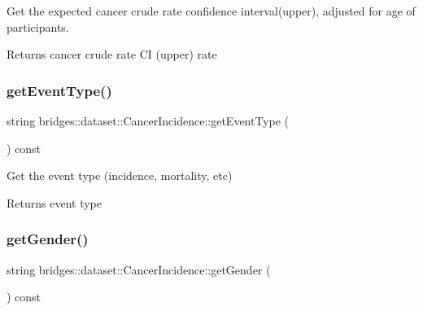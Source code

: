 Get the expected cancer crude rate confidence interval(upper), adjusted for age of participants.

\begin{DoxyReturn}{Returns}
cancer crude rate CI (upper) rate 
\end{DoxyReturn}
\mbox{\label{classbridges_1_1dataset_1_1_cancer_incidence_a964d0fcc125808e457b1fd2f79cf43bf}} 
\subsubsection{\texorpdfstring{get\+Event\+Type()}{getEventType()}}
{\footnotesize\ttfamily string bridges\+::dataset\+::\+Cancer\+Incidence\+::get\+Event\+Type (\begin{DoxyParamCaption}{ }\end{DoxyParamCaption}) const\hspace{0.3cm}{\ttfamily [inline]}}



Get the event type (incidence, mortality, etc) 

\begin{DoxyReturn}{Returns}
event type 
\end{DoxyReturn}
\mbox{\label{classbridges_1_1dataset_1_1_cancer_incidence_a0c4dcbde0ad1f81ffe4016c12d08c4c1}} 
\subsubsection{\texorpdfstring{get\+Gender()}{getGender()}}
{\footnotesize\ttfamily string bridges\+::dataset\+::\+Cancer\+Incidence\+::get\+Gender (\begin{DoxyParamCaption}{ }\end{DoxyParamCaption}) const\hspace{0.3cm}{\ttfamily [inline]}}



